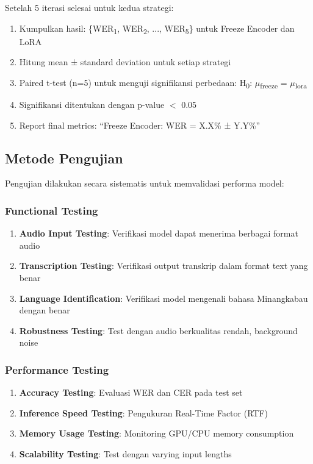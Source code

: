 Setelah 5 iterasi selesai untuk kedua strategi:

\begin{enumerate}[noitemsep]
    \item Kumpulkan hasil: \{WER\textsubscript{1}, WER\textsubscript{2}, ..., WER\textsubscript{5}\} untuk Freeze Encoder dan LoRA
    \item Hitung mean ± standard deviation untuk setiap strategi
    \item Paired t-test (n=5) untuk menguji signifikansi perbedaan: H\textsubscript{0}: $\mu$\textsubscript{freeze} = $\mu$\textsubscript{lora}
    \item Signifikansi ditentukan dengan p-value $<$ 0.05
    \item Report final metrics: ``Freeze Encoder: WER = X.X\% ± Y.Y\%''
\end{enumerate}

\subsection{Metode Pengujian}
\label{III.Metode_Uji}

Pengujian dilakukan secara sistematis untuk memvalidasi performa model:

\subsubsection{Functional Testing}

\begin{enumerate}[noitemsep]
    \item \textbf{Audio Input Testing}: Verifikasi model dapat menerima berbagai format audio
    \item \textbf{Transcription Testing}: Verifikasi output transkrip dalam format text yang benar
    \item \textbf{Language Identification}: Verifikasi model mengenali bahasa Minangkabau dengan benar
    \item \textbf{Robustness Testing}: Test dengan audio berkualitas rendah, background noise
\end{enumerate}

\subsubsection{Performance Testing}

\begin{enumerate}[noitemsep]
    \item \textbf{Accuracy Testing}: Evaluasi WER dan CER pada test set
    \item \textbf{Inference Speed Testing}: Pengukuran Real-Time Factor (RTF)
    \item \textbf{Memory Usage Testing}: Monitoring GPU/CPU memory consumption
    \item \textbf{Scalability Testing}: Test dengan varying input lengths
\end{enumerate}

